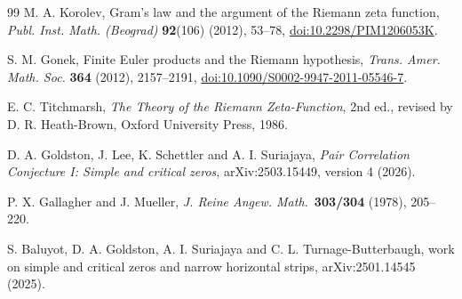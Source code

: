 \documentclass[11pt,reqno]{amsart}
\numberwithin{equation}{section}
\begin{document}
\begin{thebibliography}{99}
 M. A. Korolev, Gram's law and the argument of the Riemann zeta function, \emph{Publ. Inst. Math. (Beograd)} \textbf{92}(106) (2012), 53--78, \href{https://doi.org/10.2298/PIM1206053K}{doi:10.2298/PIM1206053K}.

 S. M. Gonek, Finite Euler products and the Riemann hypothesis, \emph{Trans. Amer. Math. Soc.} \textbf{364} (2012), 2157--2191, \href{https://doi.org/10.1090/S0002-9947-2011-05546-7}{doi:10.1090/S0002-9947-2011-05546-7}.

 E. C. Titchmarsh, \emph{The Theory of the Riemann Zeta-Function}, 2nd ed., revised by D. R. Heath-Brown, Oxford University Press, 1986.


D. A. Goldston, J. Lee, K. Schettler and A. I. Suriajaya,
\emph{Pair Correlation Conjecture I: Simple and critical zeros},
arXiv:2503.15449, version 4 (2026).

P. X. Gallagher and J. Mueller, \emph{J. Reine Angew. Math.}\ \textbf{303/304} (1978), 205--220.

S. Baluyot, D. A. Goldston, A. I. Suriajaya and C. L. Turnage-Butterbaugh,
work on simple and critical zeros and narrow horizontal strips,
arXiv:2501.14545 (2025).

\end{thebibliography}
\end{document}
